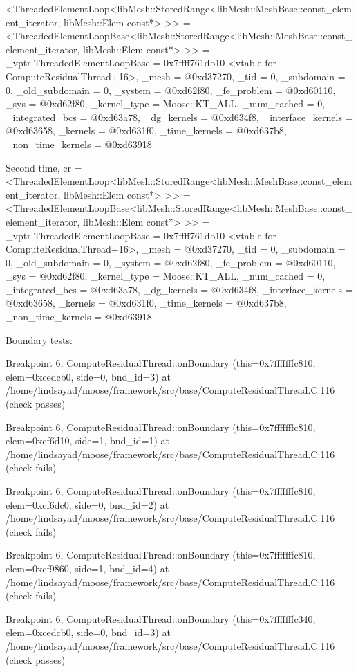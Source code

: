 {{<ThreadedElementLoop<libMesh::StoredRange<libMesh::MeshBase::const_element_iterator, libMesh::Elem const*> >> = {<ThreadedElementLoopBase<libMesh::StoredRange<libMesh::MeshBase::const_element_iterator, libMesh::Elem const*> >> = {_vptr.ThreadedElementLoopBase = 0x7ffff761db10 <vtable for ComputeResidualThread+16>, _mesh = @0xd37270, _tid = 0, _subdomain = 0, _old_subdomain = 0},
    _system = @0xd62f80, _fe_problem = @0xd60110}, _sys = @0xd62f80, _kernel_type = Moose::KT_ALL, _num_cached = 0, _integrated_bcs = @0xd63a78, _dg_kernels = @0xd634f8, _interface_kernels = @0xd63658,
  _kernels = @0xd631f0, _time_kernels = @0xd637b8, _non_time_kernels = @0xd63918}

Second time, cr =
{<ThreadedElementLoop<libMesh::StoredRange<libMesh::MeshBase::const_element_iterator, libMesh::Elem const*> >> = {<ThreadedElementLoopBase<libMesh::StoredRange<libMesh::MeshBase::const_element_iterator, libMesh::Elem const*> >> = {_vptr.ThreadedElementLoopBase = 0x7ffff761db10 <vtable for ComputeResidualThread+16>, _mesh = @0xd37270, _tid = 0, _subdomain = 0, _old_subdomain = 0},
    _system = @0xd62f80, _fe_problem = @0xd60110}, _sys = @0xd62f80, _kernel_type = Moose::KT_ALL, _num_cached = 0, _integrated_bcs = @0xd63a78, _dg_kernels = @0xd634f8, _interface_kernels = @0xd63658,
  _kernels = @0xd631f0, _time_kernels = @0xd637b8, _non_time_kernels = @0xd63918}

Boundary tests:

Breakpoint 6, ComputeResidualThread::onBoundary (this=0x7fffffffc810, elem=0xcedcb0, side=0, bnd_id=3) at /home/lindsayad/moose/framework/src/base/ComputeResidualThread.C:116 (check passes)

Breakpoint 6, ComputeResidualThread::onBoundary (this=0x7fffffffc810, elem=0xcf6d10, side=1, bnd_id=1) at /home/lindsayad/moose/framework/src/base/ComputeResidualThread.C:116 (check fails)

Breakpoint 6, ComputeResidualThread::onBoundary (this=0x7fffffffc810, elem=0xcf6dc0, side=0, bnd_id=2) at /home/lindsayad/moose/framework/src/base/ComputeResidualThread.C:116 (check fails)

Breakpoint 6, ComputeResidualThread::onBoundary (this=0x7fffffffc810, elem=0xcf9860, side=1, bnd_id=4) at /home/lindsayad/moose/framework/src/base/ComputeResidualThread.C:116 (check fails)

Breakpoint 6, ComputeResidualThread::onBoundary (this=0x7fffffffc340, elem=0xcedcb0, side=0, bnd_id=3) at /home/lindsayad/moose/framework/src/base/ComputeResidualThread.C:116 (check passes)

}
